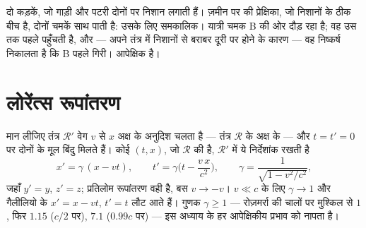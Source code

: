 \begin{omfigure}

{\small दो कड़कें, जो गाड़ी और पटरी दोनों पर निशान लगाती हैं। ज़मीन पर
की प्रेक्षिका, जो निशानों के ठीक बीच है, दोनों चमकें साथ पाती है:
उसके लिए समकालिक। यात्री चमक B की ओर दौड़ रहा है; वह उस तक पहले पहुँचती
है, और --- अपने तंत्र में निशानों से बराबर दूरी पर होने के कारण --- वह
निष्कर्ष निकालता है कि B पहले गिरी।  आपेक्षिक है।}
\end{omfigure}

\section{लोरेंत्स रूपांतरण}

\begin{theorem}[लोरेंत्स रूपांतरण]\label{thm:b3:relativistic-kinematics:lorentz}
मान लीजिए तंत्र $\mathcal R'$ वेग $v$ से $x$ अक्ष के अनुदिश चलता है ---
तंत्र $\mathcal R$ के अक्ष के --- और $t = t' = 0$ पर दोनों के मूल बिंदु मिलते हैं।
कोई  $(t, x)$, जो $\mathcal R$ की है, $\mathcal R'$ में ये निर्देशांक रखती है
\[
x' = \gamma\,(x - vt) , \qquad
t' = \gamma\Big(t - \frac{v\,x}{c^2}\Big) , \qquad
\gamma = \frac{1}{\sqrt{1 - v^2/c^2}} ,
\]
जहाँ $y' = y$, $z' = z$; प्रतिलोम रूपांतरण वही है, बस
$v \to -v$। $v \ll c$ के लिए $\gamma \to 1$ और गैलीलियो के
$x' = x - vt$, $t' = t$ लौट आते हैं। गुणक $\gamma \ge 1$ --- रोज़मर्रा
की चालों पर मुश्किल से $1$, फिर $1.15$ ($c/2$ पर), $7.1$ ($0.99c$ पर) --- इस
अध्याय के हर आपेक्षिकीय प्रभाव को नापता है।
\end{theorem}

